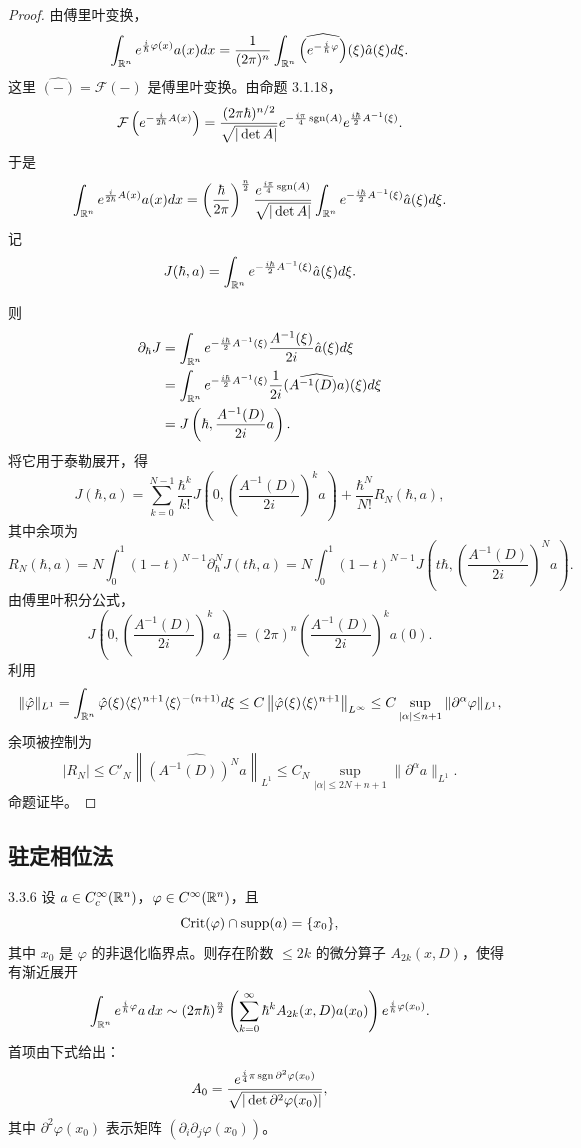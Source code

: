 \begin{proof}
由傅里叶变换，
\[
\int_{\mathbb{R}^n}e^{\frac i\hbar\varphi(x)}a(x)dx=\frac{1}{(2\pi)^n}\int_{\mathbb{R}^n}\widehat{\left(e^{-\frac i\hbar\varphi}\right)}(\xi)\hat a(\xi)d\xi.
\]
这里 $\widehat{(-)}=\mathcal F(-)$ 是傅里叶变换。由命题 3.1.18，
\[
\mathcal F\left(e^{-\frac i{2\hbar}A(x)}\right)=\frac{(2\pi\hbar)^{n/2}}{\sqrt{|\det A|}}e^{-\frac{i\pi}{4}\operatorname{sgn}(A)}e^{\frac{i\hbar}{2}A^{-1}(\xi)}.
\]
于是
\[
\int_{\mathbb{R}^n}e^{\frac i{2\hbar}A(x)}a(x)dx=\left(\frac{\hbar}{2\pi}\right)^{\frac n2}\frac{e^{\frac{i\pi}{4}\operatorname{sgn}(A)}}{\sqrt{|\det A|}}\int_{\mathbb{R}^n}e^{-\frac{i\hbar}{2}A^{-1}(\xi)}\hat a(\xi)d\xi.
\]
记
\[
J(\hbar,a)=\int_{\mathbb{R}^n}e^{-\frac{i\hbar}{2}A^{-1}(\xi)}\hat a(\xi)d\xi.
\]


则
\begin{align*}
\partial_\hbar J&=\int_{\mathbb{R}^n}e^{-\frac{i\hbar}{2}A^{-1}(\xi)}\frac{A^{-1}(\xi)}{2i}\hat a(\xi)d\xi\\
&=\int_{\mathbb{R}^n}e^{-\frac{i\hbar}{2}A^{-1}(\xi)}\frac{1}{2i}\widehat{\left(A^{-1}(D)a\right)}(\xi)d\xi\\
&=J\left(\hbar,\frac{A^{-1}(D)}{2i}a\right).
\end{align*}
将它用于泰勒展开，得
\[
J(\hbar,a)=\sum_{k=0}^{N-1}\frac{\hbar^k}{k!}J\left(0,\left(\frac{A^{-1}(D)}{2i}\right)^ka\right)+\frac{\hbar^N}{N!}R_N(\hbar,a),
\]
其中余项为
\[
R_N(\hbar,a)=N\int_0^1(1-t)^{N-1}\partial_\hbar^NJ(t\hbar,a)=N\int_0^1(1-t)^{N-1}J\left(t\hbar,\left(\frac{A^{-1}(D)}{2i}\right)^Na\right).
\]
由傅里叶积分公式，
\[
J\left(0,\left(\frac{A^{-1}(D)}{2i}\right)^ka\right)=(2\pi)^n\left(\frac{A^{-1}(D)}{2i}\right)^ka(0).
\]
利用
\[
\|\hat\varphi\|_{L^1}=\int_{\mathbb{R}^n}\hat\varphi(\xi)\langle\xi\rangle^{n+1}\langle\xi\rangle^{-(n+1)}d\xi\le C\left\|\hat\varphi(\xi)\langle\xi\rangle^{n+1}\right\|_{L^\infty}\le C\sup_{|\alpha|\le n+1}\|\partial^\alpha\varphi\|_{L^1},
\]
余项被控制为
\[
|R_N|\le C'_N\left\|\widehat{\left(A^{-1}(D)\right)^Na}\right\|_{L^1}\le C_N\sup_{|\alpha|\le2N+n+1}\|\partial^\alpha a\|_{L^1}.
\]
命题证毕。
\end{proof}

\subsection{驻定相位法}

\begin{theorem}{3.3.6}
设 $a\in C_c^\infty(\mathbb{R}^n)$，$\varphi\in C^\infty(\mathbb{R}^n)$，且
\[
\operatorname{Crit}(\varphi)\cap\operatorname{supp}(a)=\{x_0\},
\]
其中 $x_0$ 是 $\varphi$ 的非退化临界点。则存在阶数 $\le2k$ 的微分算子 $A_{2k}(x,D)$，使得有渐近展开
\[
\int_{\mathbb{R}^n}e^{\frac i\hbar\varphi}a\,dx\sim(2\pi\hbar)^{\frac n2}\left(\sum_{k=0}^\infty\hbar^kA_{2k}(x,D)a(x_0)\right)e^{\frac i\hbar\varphi(x_0)}.
\]
首项由下式给出：
\[
A_0=\frac{e^{\frac i4\pi\operatorname{sgn}\partial^2\varphi(x_0)}}{\sqrt{|\det\partial^2\varphi(x_0)|}},
\]
其中 $\partial^2\varphi(x_0)$ 表示矩阵 $(\partial_i\partial_j\varphi(x_0))$。
\end{theorem}

